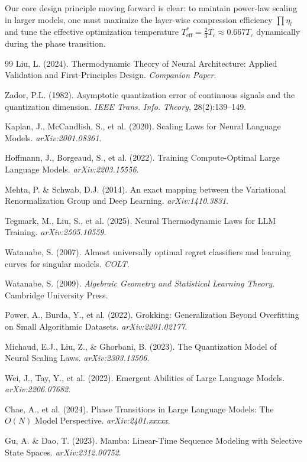 \documentclass[11pt, a4paper]{article}
\theoremstyle{plain}
\begin{document}
Our core design principle moving forward is clear: to maintain power-law scaling in larger models, one must maximize the layer-wise compression efficiency $\prod\eta_l$ and tune the effective optimization temperature $T_{\text{eff}}^* = \frac{2}{3} T_c \approx 0.667 T_c$ dynamically during the phase transition.


\begin{thebibliography}{99}
Liu, L. (2024). \newblock Thermodynamic Theory of Neural Architecture: Applied Validation and First-Principles Design.
\newblock \textit{Companion Paper}.



Zador, P.L. (1982). Asymptotic quantization error of continuous signals and the quantization dimension. \emph{IEEE Trans. Info. Theory}, 28(2):139--149.

Kaplan, J., McCandlish, S., et al. (2020). Scaling Laws for Neural Language Models. \emph{arXiv:2001.08361}.

Hoffmann, J., Borgeaud, S., et al. (2022). Training Compute-Optimal Large Language Models. \emph{arXiv:2203.15556}.

Mehta, P. \& Schwab, D.J. (2014). An exact mapping between the Variational Renormalization Group and Deep Learning. \emph{arXiv:1410.3831}.

Tegmark, M., Liu, S., et al. (2025). Neural Thermodynamic Laws for LLM Training. \emph{arXiv:2505.10559}.

Watanabe, S. (2007). Almost universally optimal regret classifiers and learning curves for singular models. \emph{COLT}.

Watanabe, S. (2009). \emph{Algebraic Geometry and Statistical Learning Theory}. Cambridge University Press.

Power, A., Burda, Y., et al. (2022). Grokking: Generalization Beyond Overfitting on Small Algorithmic Datasets. \emph{arXiv:2201.02177}.

Michaud, E.J., Liu, Z., \& Ghorbani, B. (2023). The Quantization Model of Neural Scaling Laws. \emph{arXiv:2303.13506}.

Wei, J., Tay, Y., et al. (2022). Emergent Abilities of Large Language Models. \emph{arXiv:2206.07682}.

Chae, A., et al. (2024). Phase Transitions in Large Language Models: The $O(N)$ Model Perspective. \emph{arXiv:2401.xxxxx}.

Gu, A. \& Dao, T. (2023). Mamba: Linear-Time Sequence Modeling with Selective State Spaces. \emph{arXiv:2312.00752}.

\end{thebibliography}
\end{document}

